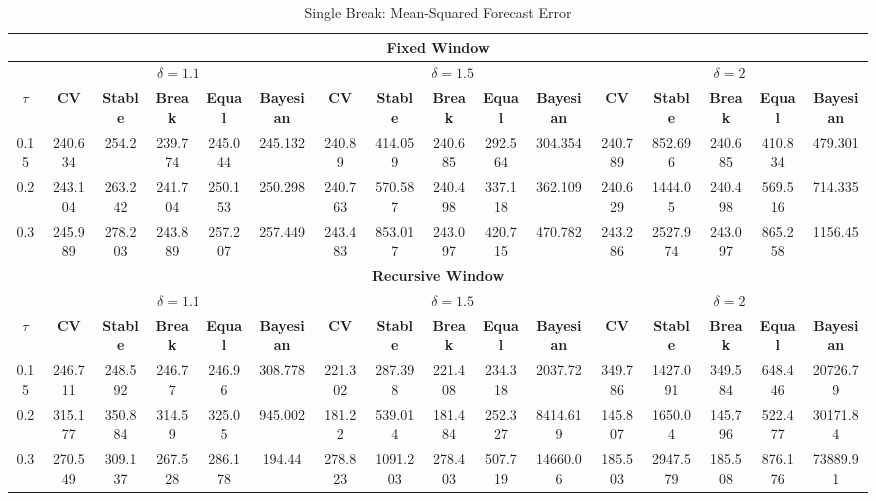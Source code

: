 \newpage
\begin{sidewaystable}
\centering
\caption{Single Break: Mean-Squared Forecast Error}
\begin{adjustbox}{width=\textwidth,totalheight=\textheight,keepaspectratio}
\begin{tabular}{cccccccccccccccc} \hline \hline
\multicolumn{16}{c}{\textbf{Fixed Window}}\\ \hline
 & \multicolumn{5}{c}{$\delta=1.1$} & \multicolumn{5}{c}{$\delta=1.5$} & \multicolumn{5}{c}{$\delta=2$} \\ \hline
$\tau$ & \textbf{CV} & \textbf{Stable} & \textbf{Break} & \textbf{Equal} & \textbf{Bayesian} & \textbf{CV} & \textbf{Stable} & \textbf{Break} & \textbf{Equal} & \textbf{Bayesian} & \textbf{CV} & \textbf{Stable} & \textbf{Break} & \textbf{Equal} & \textbf{Bayesian}\\ \hline
0.15 & 240.634 & 254.2 & 239.774 & 245.044 & 245.132 & 240.89 & 414.059 & 240.685 & 292.564 & 304.354 & 240.789 & 852.696 & 240.685 & 410.834 & 479.301 \\
0.2	& 243.104 & 263.242 & 241.704 & 250.153 & 250.298 & 240.763 & 570.587 & 240.498 & 337.118 & 362.109 & 240.629 & 1444.05 & 240.498 & 569.516 & 714.335\\
0.3 & 245.989 & 278.203 & 243.889 & 257.207 & 257.449 & 243.483 & 853.017 & 243.097 & 420.715 & 470.782 & 243.286 & 2527.974 & 243.097 & 865.258 & 1156.45\\ \hline \hline

\multicolumn{16}{c}{\textbf{Recursive Window}}\\ \hline
 & \multicolumn{5}{c}{$\delta=1.1$} & \multicolumn{5}{c}{$\delta=1.5$} & \multicolumn{5}{c}{$\delta=2$} \\ \hline
$\tau$ & \textbf{CV} & \textbf{Stable} & \textbf{Break} & \textbf{Equal} & \textbf{Bayesian} & \textbf{CV} & \textbf{Stable} & \textbf{Break} & \textbf{Equal} & \textbf{Bayesian} & \textbf{CV} & \textbf{Stable} & \textbf{Break} & \textbf{Equal} & \textbf{Bayesian}\\ \hline
0.15 & 246.711 & 248.592 & 246.77 & 246.96 & 308.778 & 221.302 & 287.398 & 221.408 & 234.318 & 2037.72 & 349.786 & 1427.091 & 349.584 & 648.446 & 20726.79\\
0.2 & 315.177 & 350.884 & 314.59 & 325.05 & 945.002 & 181.22 & 539.014 & 181.484 & 252.327 & 8414.619 & 145.807 & 1650.04 & 145.796 & 522.477 & 30171.84\\
0.3 & 270.549 & 309.137 & 267.528 & 286.178 & 194.44 & 278.823 & 1091.203 & 278.403 & 507.719 & 14660.06 & 185.503 & 2947.579 & 185.508 & 876.176 & 73889.91\\ \hline \hline


\end{tabular}
\end{adjustbox}
\end{sidewaystable}
